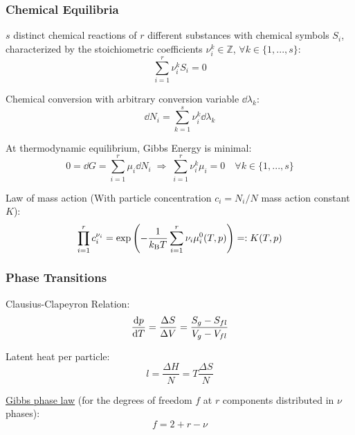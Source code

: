 		\subsubsection{Chemical Equilibria}
			\noindent
			$s$ distinct chemical reactions of $r$ different substances with chemical symbols $S_i$, characterized by the stoichiometric coefficients $\nu_i^k\in\mathbb{Z}$, $\forall k\in\lbrace1,...,s\rbrace$:
			\begin{equation}
				\sum_{i=1}^r \nu_i^k S_i = 0
			\end{equation}

			\noindent
			Chemical conversion with arbitrary conversion variable $\dd \lambda_k$:
			\begin{equation}
				\dd N_i = \sum_{k=1}^s \nu_i^k \dd \lambda_k
			\end{equation}

			\noindent
			At thermodynamic equilibrium, Gibbs Energy is minimal:
			\begin{equation}
				0 = \dd G = \sum_{i=1}^r \mu_i \dd N_i \;\Rightarrow\; \sum_{i=1}^r \nu_i^k \mu_i = 0 \quad\forall k\in\lbrace1,...,s\rbrace
			\end{equation}

			\noindent
			Law of mass action (With particle concentration $c_i = N_i/N$ mass action constant $K$):
			\begin{equation}
				\prod_{i=1}^r	c_i^{\nu_i} = \exp\left( -\frac{1}{k_{\text{B}} T}\sum_{i=1}^r \nu_i\mu_i^0(T,p) \right) =: K(T,p)
			\end{equation}

		\subsubsection{Phase Transitions}
			\noindent
			Clausius-Clapeyron Relation:
			\begin{equation}
				\dv{p}{T} = \frac{\Delta S}{\Delta V} = \frac{S_g - S_{fl}}{V_g - V_{fl}}
			\end{equation}

			\noindent
			Latent heat per particle:
			\begin{equation}
				l = \frac{\Delta H}{N} = T\frac{\Delta S}{N}
			\end{equation}

			\noindent
			\href{https://en.wikipedia.org/wiki/Phase_rule}{Gibbs phase law} (for the degrees of freedom $f$ at $r$ components distributed in $\nu$ phases):
			\begin{equation}
				f = 2 + r - \nu
			\end{equation}

